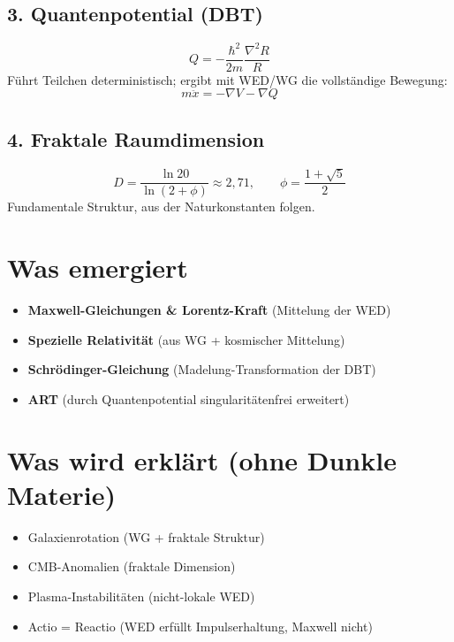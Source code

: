\documentclass[12pt,a4paper]{article}
\begin{document}
\subsection*{3. Quantenpotential (DBT)}
\begin{equation}
Q = -\frac{\hbar^2}{2m}\frac{\nabla^2R}{R}
\end{equation}
Führt Teilchen deterministisch; ergibt mit WED/WG die vollständige Bewegung:
\begin{equation}
m\ddot{x} = -\nabla V - \nabla Q
\end{equation}

\subsection*{4. Fraktale Raumdimension}
\begin{equation}
D = \frac{\ln 20}{\ln(2+\phi)} \approx 2{,}71, \qquad \phi = \frac{1+\sqrt{5}}{2}
\end{equation}
Fundamentale Struktur, aus der Naturkonstanten folgen.

\section*{Was emergiert}
\begin{itemize}
    \item \textbf{Maxwell-Gleichungen \& Lorentz-Kraft} (Mittelung der WED)
    \item \textbf{Spezielle Relativität} (aus WG + kosmischer Mittelung)
    \item \textbf{Schrödinger-Gleichung} (Madelung-Transformation der DBT)
    \item \textbf{ART} (durch Quantenpotential singularitätenfrei erweitert)
\end{itemize}

\section*{Was wird erklärt (ohne Dunkle Materie)}
\begin{itemize}
    \item Galaxienrotation (WG + fraktale Struktur)
    \item CMB-Anomalien (fraktale Dimension)
    \item Plasma-Instabilitäten (nicht-lokale WED)
    \item Actio = Reactio (WED erfüllt Impulserhaltung, Maxwell nicht)
\end{itemize}
\end{document}

